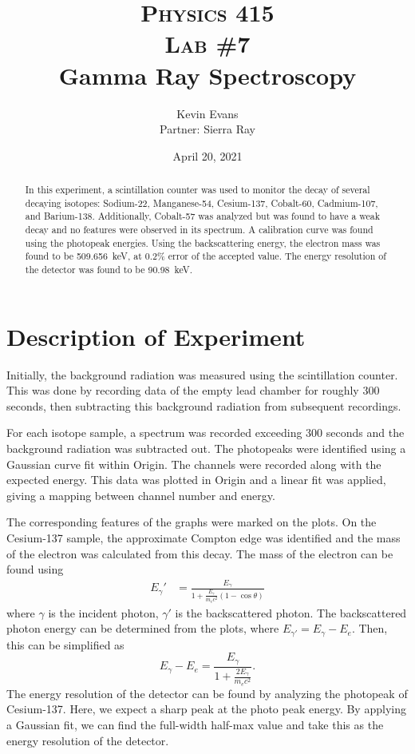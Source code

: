 \documentclass[notitlepage]{report}
\title{
	\textsc{ \small
		Physics 415
	} \\
	{\textsc{\small Lab \#7}} \\
	Gamma Ray Spectroscopy
}
\author{Kevin Evans \\ Partner: Sierra Ray}
\date{April 20, 2021}
\begin{document}
	\begin{titlingpage}
		\maketitle
		\begin{abstract}
			\noindent In this experiment, a scintillation counter was used to monitor the decay of several decaying isotopes: Sodium-22, Manganese-54, Cesium-137, Cobalt-60, Cadmium-107, and Barium-138. Additionally, Cobalt-57 was analyzed but was found to have a weak decay and no features were observed in its spectrum.
			A calibration curve was found using the photopeak energies. Using the backscattering energy, the electron mass was found to be \SI{509.656}{\keV}, at 0.2\% error of the accepted value. The energy resolution of the detector was found to be \SI{90.98}{\keV}.
		\end{abstract}
	\end{titlingpage}

	\section{Description of Experiment}
	Initially, the background radiation was measured using the scintillation counter. This was done by recording data of the empty lead chamber for roughly 300 seconds, then subtracting this background radiation from subsequent recordings.
	
	For each isotope sample, a spectrum was recorded exceeding 300 seconds and the background radiation was subtracted out. The photopeaks were identified using a Gaussian curve fit within Origin. The channels were recorded along with the expected energy. This data was plotted in Origin and a linear fit was applied, giving a mapping between channel number and energy.
	
	The corresponding features of the graphs were marked on the plots. On the Cesium-137 sample, the approximate Compton edge was identified and the mass of the electron was calculated from this decay. The mass of the electron can be found using \begin{align*}
		E_\gamma' & = \frac{E_\gamma}{1 + \frac{ E_\gamma }{m_e c^2} \left(1 - \cos\theta\right)}
	\end{align*}
	where $\gamma$ is the incident photon, $\gamma'$ is the backscattered photon. The backscattered photon energy can be determined from the plots, where $E_{\gamma'} = E_\gamma - E_e$. Then, this can be simplified as \begin{equation}
		E_\gamma - E_e = \frac{E_\gamma}{1 + \frac{2 E_\gamma}{m_e c^2}}. \label{eq:compton}
	\end{equation}
	The energy resolution of the detector can be found by analyzing the photopeak of Cesium-137. Here, we expect a sharp peak at the photo peak energy. By applying a Gaussian fit, we can find the full-width half-max value and take this as the energy resolution of the detector.
\end{document}
